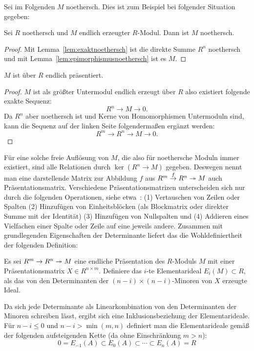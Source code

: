 Sei im Folgenden $M$ noethersch. Dies ist zum Beispiel bei folgender Situation gegeben:
\begin{cor}
	Sei $R$ noethersch und $M$ endlich erzeugter $R$-Modul. Dann ist $M$ noethersch.
\end{cor}
\begin{proof}
	Mit Lemma~\ref{lem:exaktnoethersch} ist die direkte Summe $R^n$ noethersch und mit Lemma~\ref{lem:epimorphismusnoethersch} ist es $M$.
\end{proof}
\begin{lem}
	$M$ ist über $R$ endlich präsentiert. 
\end{lem}
\begin{proof}
	$M$ ist als größter Untermodul endlich erzeugt über $R$ also existiert folgende exakte Sequenz:
	\[
		R^n \to M \to 0.
	\]
	Da $R^n$ aber noethersch ist und Kerne von Homomorphismen Untermoduln sind, kann die Sequenz auf der linken Seite folgendermaßen ergänzt werden:
	\[
		R^m \to R^n \to M \to 0.
	\]
\end{proof}

 Für eine solche freie Auflösung von $M$, die also für noethersche Moduln immer existiert, sind alle Relationen durch $\ker(R^n\to M)$ gegeben. Deswegen nennt man eine darstellende Matrix zur Abbildung $f$ aus $R^m \stackrel f \to R^n \twoheadrightarrow M$ auch Präsentationsmatrix. Verschiedene Präsentationsmatrizen unterscheiden sich nur durch die folgenden Operationen, siehe etwa~\cite[Theorem~6.1]{LickorishW.B.Raymond.1997}:
	(1) Vertauschen von Zeilen oder Spalten (2) Hinzufügen von Einheitsblöcken (als Blockmatrix oder direkter Summe mit der Identität) (3) Hinzufügen von Nullspalten und (4) Addieren eines Vielfachen einer Spalte oder Zeile auf eine jeweils andere. Zusammen mit grundlegenden Eigenschaften der Determinante liefert das die Wohldefiniertheit der folgenden Definition:
	\begin{defn}
	Es sei $R^m \to R^n \twoheadrightarrow M$ eine endliche Präsentation des $R$-Moduls $M$ mit einer Präsentationsmatrix $X \in R^{n \times m}$. Definiere das $i$-te Elementarideal $E_i(M) \subset R$, als das von den Determinanten der $(n-i)\times (n-i)$-Minoren von $X$ erzeugte Ideal.
    	\end{defn}

        Da sich jede Determinante als Linearkombination von den Determinanten der Minoren schreiben lässt, ergibt sich eine Inklusionsbeziehung der Elementarideale. Für $n-i\leq 0$ und $n-i > \min(m,n)$ definiert man die Elementarideale gemäß der folgenden aufsteigenden Kette (da ohne Einschränkung $m>n$):
        \[
             0=E_{-1}(A)\subset E_0(A) \subset \cdots \subset E_n(A) = R
         \] 

